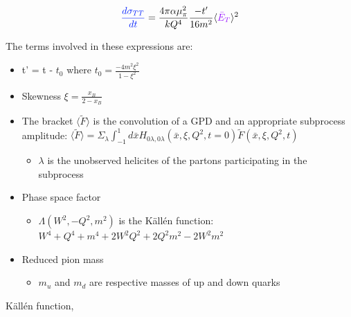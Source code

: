     
    \begin{equation}\label{eq:sigmaTT}
        \textcolor{sigmaTT}{\frac{d\sigma_{TT}}{dt}} = 
        \frac{4\pi\alpha \mu_{\pi}^2}{kQ^4}
        \frac{-t'}{16m^2}
        \langle \GPDETbarEQ \rangle^2   
    \end{equation} 



    
    The terms involved in these expressions are:
   
    \begin{itemize}
    \item t' = t - $t_0$ where $t_0 = \frac{-4m^2\xi^2}{1-\xi^2}$
    \item Skewness $\xi = \frac{x_B}{2-x_B}$
    \item   The bracket $\langle \tilde{F} \rangle$ is the convolution of a GPD and an appropriate subprocess amplitude:
    $
    \langle \tilde{F} \rangle =  \Sigma_{\lambda} \int_{-1}^{1} d\bar{x}H_{0\lambda,0\lambda}\left( \bar{x}, \xi, Q^2, t=0  \right)\tilde{F}\left( \bar{x}, \xi, Q^2, t  \right)\  
    $
    \begin{itemize}
        \item $\lambda$ is the unobserved helicites of the partons participating in the subprocess 
    \end{itemize}
    \item Phase space factor \scalebox{1}{%
     $           k = 16\pi \left( W^2 -m^2)\sqrt{\Lambda(W^2,-Q^2,m^2)} \right)$ 
    }
    \begin{itemize}
    \item $\Lambda(W^2,-Q^2,m^2)$ is the Källén function: $W^4 + Q^4 + m^4 + 2W^2Q^2 + 2Q^2m^2 - 2W^2m^2$
    \end{itemize}
    
    \item Reduced pion mass     
    \begin{itemize}
        \item   $m_u$ and $m_d$ are respective masses of up and down quarks
    \end{itemize}
    \end{itemize}

K\"{a}ll\'{e}n function,
    
    
    
    

  


    
    
